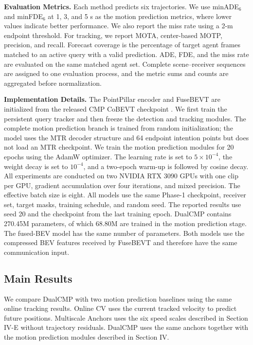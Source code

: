\documentclass[lettersize,journal]{IEEEtran}
\begin{document}
\textbf{Evaluation Metrics.} Each method predicts six trajectories. We use minADE$_6$ and minFDE$_6$ at 1, 3, and 5 s as the motion prediction metrics, where lower values indicate better performance. We also report the miss rate using a 2-m endpoint threshold. For tracking, we report MOTA, center-based MOTP, precision, and recall. Forecast coverage is the percentage of target agent frames matched to an active query with a valid prediction. ADE, FDE, and the miss rate are evaluated on the same matched agent set. Complete scene--receiver sequences are assigned to one evaluation process, and the metric sums and counts are aggregated before normalization.

\textbf{Implementation Details.} The PointPillar encoder and FuseBEVT are initialized from the released CMP CoBEVT checkpoint \cite{wang2025cmp}. We first train the persistent query tracker and then freeze the detection and tracking modules. The complete motion prediction branch is trained from random initialization; the model uses the MTR decoder structure and 64 endpoint intention points but does not load an MTR checkpoint. We train the motion prediction modules for 20 epochs using the AdamW optimizer. The learning rate is set to \(5\times10^{-4}\), the weight decay is set to \(10^{-4}\), and a two-epoch warm-up is followed by cosine decay. All experiments are conducted on two NVIDIA RTX 3090 GPUs with one clip per GPU, gradient accumulation over four iterations, and mixed precision. The effective batch size is eight. All models use the same Phase-1 checkpoint, receiver set, target masks, training schedule, and random seed. The reported results use seed 20 and the checkpoint from the last training epoch. DualCMP contains 270.45M parameters, of which 68.80M are trained in the motion prediction stage. The fused-BEV model has the same number of parameters. Both models use the compressed BEV features received by FuseBEVT and therefore have the same communication input.

\subsection{Main Results}

We compare DualCMP with two motion prediction baselines using the same online tracking results. Online CV uses the current tracked velocity to predict future positions. Multiscale Anchors uses the six speed scales described in Section IV-E without trajectory residuals. DualCMP uses the same anchors together with the motion prediction modules described in Section IV.
\end{document}
